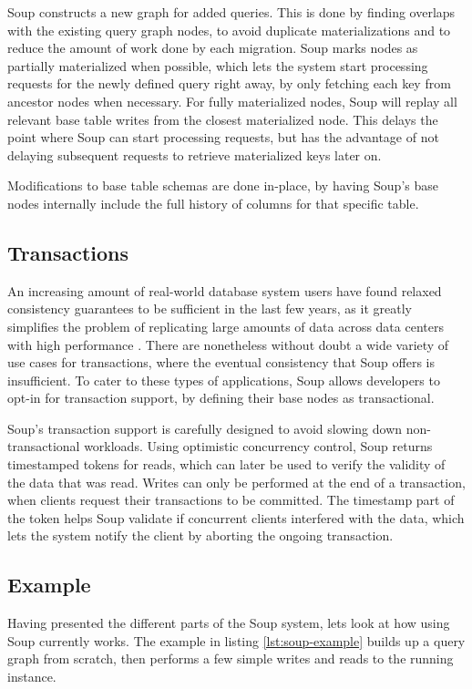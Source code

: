 \documentclass[b5paper]{report}
\begin{document}
Soup constructs a new graph for added queries. This is done by finding overlaps
with the existing query graph nodes, to avoid duplicate materializations and
to reduce the amount of work done by each migration. Soup marks nodes as
partially materialized when possible, which lets the system start processing
requests for the newly defined query right away, by only fetching each key from
ancestor nodes when necessary. For fully materialized nodes, Soup will replay
all relevant base table writes from the closest materialized node. This
delays the point where Soup can start processing requests, but has the advantage
of not delaying subsequent requests to retrieve materialized keys later on.

Modifications to base table schemas are done in-place, by having Soup's base
nodes internally include the full history of columns for that specific table.

\subsection{Transactions}
An increasing amount of real-world database system users have found relaxed
consistency guarantees to be sufficient in the last few years, as it greatly
simplifies the problem of replicating large amounts of data across data centers
with high performance \cite{existential}. There are nonetheless without doubt
a wide variety of use cases for transactions, where the eventual consistency that
Soup offers is insufficient. To cater to these types of applications, Soup
allows developers to opt-in for transaction support, by defining their base
nodes as transactional.

Soup's transaction support is carefully designed to avoid slowing down
non-transactional workloads. Using optimistic concurrency control, Soup returns
timestamped tokens for reads, which can later be used to verify the validity of
the data that was read. Writes can only be performed at the end of a
transaction, when clients request their transactions to be committed. The
timestamp part of the token helps Soup validate if concurrent clients
interfered with the data, which lets the system notify the client by aborting
the ongoing transaction.

\subsection{Example} \label{example}
Having presented the different parts of the Soup system, lets look at how using
Soup currently works. The example in listing \ref{lst:soup-example} builds up a query
graph from scratch, then performs a few simple writes and reads to the running
instance.
\end{document}
